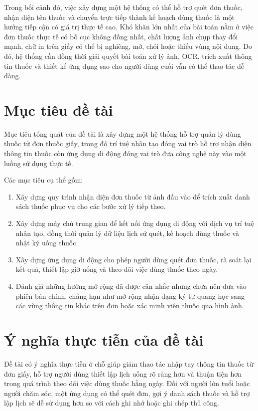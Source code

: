 \documentclass[12pt,a4paper]{report}
\begin{document}
Trong bối cảnh đó, việc xây dựng một hệ thống có thể hỗ trợ quét đơn thuốc, nhận diện tên thuốc và chuyển trực tiếp thành kế hoạch dùng thuốc là một hướng tiếp cận có giá trị thực tế cao. Khó khăn lớn nhất của bài toán nằm ở việc đơn thuốc thực tế có bố cục không đồng nhất, chất lượng ảnh chụp thay đổi mạnh, chữ in trên giấy có thể bị nghiêng, mờ, chói hoặc thiếu vùng nội dung. Do đó, hệ thống cần đồng thời giải quyết bài toán xử lý ảnh, OCR, trích xuất thông tin thuốc và thiết kế ứng dụng sao cho người dùng cuối vẫn có thể thao tác dễ dàng.

\section{Mục tiêu đề tài}

Mục tiêu tổng quát của đề tài là xây dựng một hệ thống hỗ trợ quản lý dùng thuốc từ đơn thuốc giấy, trong đó trí tuệ nhân tạo đóng vai trò hỗ trợ nhận diện thông tin thuốc còn ứng dụng di động đóng vai trò đưa công nghệ này vào một luồng sử dụng thực tế.

Các mục tiêu cụ thể gồm:

\begin{enumerate}[label=\arabic*.]
    \item Xây dựng quy trình nhận diện đơn thuốc từ ảnh đầu vào để trích xuất danh sách thuốc phục vụ cho các bước xử lý tiếp theo.
    \item Xây dựng máy chủ trung gian để kết nối ứng dụng di động với dịch vụ trí tuệ nhân tạo, đồng thời quản lý dữ liệu lịch sử quét, kế hoạch dùng thuốc và nhật ký uống thuốc.
    \item Xây dựng ứng dụng di động cho phép người dùng quét đơn thuốc, rà soát lại kết quả, thiết lập giờ uống và theo dõi việc dùng thuốc theo ngày.
    \item Đánh giá những hướng mở rộng đã được cân nhắc nhưng chưa nên đưa vào phiên bản chính, chẳng hạn như mở rộng nhận dạng ký tự quang học sang các vùng thông tin khác trên đơn hoặc xác minh viên thuốc qua hình ảnh.
\end{enumerate}

\section{Ý nghĩa thực tiễn của đề tài}

Đề tài có ý nghĩa thực tiễn ở chỗ giúp giảm thao tác nhập tay thông tin thuốc từ đơn giấy, hỗ trợ người dùng thiết lập lịch uống rõ ràng hơn và thuận tiện hơn trong quá trình theo dõi việc dùng thuốc hằng ngày. Đối với người lớn tuổi hoặc người chăm sóc, một ứng dụng có thể quét đơn, gợi ý danh sách thuốc và hỗ trợ lập lịch sẽ dễ sử dụng hơn so với cách ghi nhớ hoặc ghi chép thủ công.
\end{document}
